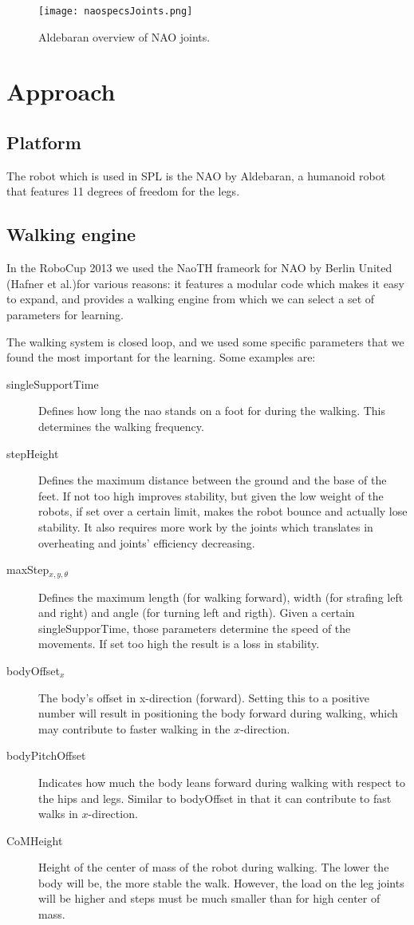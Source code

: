 \documentclass[a4paper, twocolumn]{article}
\begin{document}
\begin{figure}
	\center
	\texttt{[image: naospecsJoints.png]}
	\caption{Aldebaran overview of NAO joints.}
	\label{fig:joints}
\end{figure}

\section{Approach}
\subsection{Platform}
The robot which is used in SPL is the NAO by Aldebaran, a humanoid robot that features 11 degrees of freedom for the legs.

\subsection{Walking engine}
In the RoboCup 2013 we used the NaoTH frameork for NAO by Berlin United (Hafner et al.)for various reasons: it features a modular code which makes it easy to expand, and provides a walking engine from which we can select a set of parameters for learning. 

The walking system is closed loop, and we used some specific parameters that we found the most important for the learning.
Some examples are:
\begin{description}
\item[singleSupportTime] Defines how long the nao stands on a foot for during the walking. This determines the walking frequency.
\item[stepHeight] Defines the maximum distance between the ground and the base of the feet. If not too high improves stability, but given the low weight of the robots, if set over a certain limit, makes the robot bounce and actually lose stability. It also requires more work by the joints which translates in overheating and joints' efficiency decreasing. 
\item[maxStep$_{x,y, \theta }$] Defines the maximum length (for walking forward), width (for strafing left and right) and angle (for turning left and rigth). Given a certain singleSupporTime, those parameters determine the speed of the movements. If set too high the result is a loss in stability.
\item[bodyOffset$_{x}$] The body's offset in x-direction (forward). Setting this to a positive number will result in positioning the body forward during walking, which may contribute to faster walking in the $x$-direction.
\item[bodyPitchOffset] Indicates how much the body leans forward during walking with respect to the hips and legs. Similar to bodyOffset in that it can contribute to fast walks in $x$-direction. 
\item[CoMHeight] Height of the center of mass of the robot during walking. The lower the body will be, the more stable the walk. However, the load on the leg joints will be higher and steps must be much smaller than for high center of mass. 
\end{description}
\end{document}
